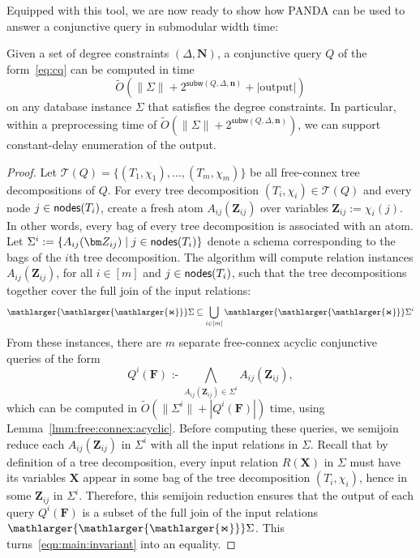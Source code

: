 \documentclass{theoretics}
\newcommand{\norm}[1]{\|#1\|}
\newcommand{\set}[1]{\{#1\}}                    %
\newcommand{\calT}{\mathcal T}
\newcommand{\cd}{\text{ :- }}
\newcommand{\bigjoin}{\mathlarger{\mathlarger{\mathlarger{\Join}}}}
\newcommand{\nodes}{\text{\sf nodes}}
\newcommand{\panda}{\textsf{PANDA}\xspace}
\newcommand{\subm}{\textsf{subw}}
\begin{document}
%
Equipped with this tool, we are now ready to show how \panda can be used to answer a
conjunctive query in submodular width time:

\begin{theorem}  Given a set of degree constraints
  $(\Delta, \bm N)$, a conjunctive query $Q$ of the form~\eqref{eq:cq} can be computed in
  time
  \[ \tilde O(\norm{\Sigma} + 2^{\subm(Q, \Delta, \bm n)} + |\text{output}|) \]
  on any database instance $\Sigma$ that satisfies the degree constraints.
  In particular, within a preprocessing time of $\tilde O(\norm{\Sigma} + 2^{\subm(Q, \Delta, \bm n)})$,
  we can support constant-delay enumeration of the output.
  \label{thm:algo:subw}
\end{theorem}
\begin{proof}
  Let $\calT(Q)=\set{(T_1,\chi_1), \ldots, (T_m, \chi_m)}$ be all free-connex tree
  decompositions of $Q$. For every tree decomposition $(T_i, \chi_i) \in \calT(Q)$ and every
  node $j \in \nodes(T_i)$, create a fresh atom $A_{ij}(\bm Z_{ij})$ over variables $\bm
  Z_{ij} := \chi_i(j)$. In other words, every bag of every tree decomposition is associated
  with an atom. Let $\Sigma^i := \{ A_{ij}(\bm Z_{ij}) \mid j \in \nodes(T_i)
  \}$ denote a schema corresponding to the bags of the $i$th tree decomposition. The
  algorithm will compute relation instances $A_{ij}(\bm Z_{ij})$, for all $i \in [m]$ and $j
  \in \nodes(T_i)$, such that the tree decompositions together cover the full join of the
  input relations:
  \begin{align}
    \bigjoin \Sigma \subseteq \bigcup_{i \in [m]} \bigjoin \Sigma^i
    \label{eqn:main:invariant}
  \end{align}
  From these instances, there are $m$ separate free-connex acyclic conjunctive
  queries of the form
  \[Q^i(\bm F) \cd \bigwedge_{A_{ij}(\bm Z_{ij}) \in \Sigma^i}A_{ij}(\bm Z_{ij}),\] which
  can be computed in $\tilde O(\norm{\Sigma^i} + |Q^i(\bm F)|)$ time, using
  Lemma~\ref{lmm:free:connex:acyclic}.
  Before computing these queries, we semijoin reduce each $A_{ij}(\bm Z_{ij})$ in $\Sigma^i$
  with all the input relations in $\Sigma$.
  Recall that by definition of a tree decomposition, every input relation $R(\bm X)$ in $\Sigma$
  must have its variables $\bm X$ appear in some bag of the tree decomposition $(T_i, \chi_i)$, hence
  in some $\bm Z_{ij}$ in $\Sigma^i$.
  Therefore, this semijoin reduction ensures that the output of each query $Q^i(\bm F)$ is a subset of the full join of the input relations $\bigjoin \Sigma$. This turns~\eqref{eqn:main:invariant} into an equality.


\end{proof}
\end{document}

